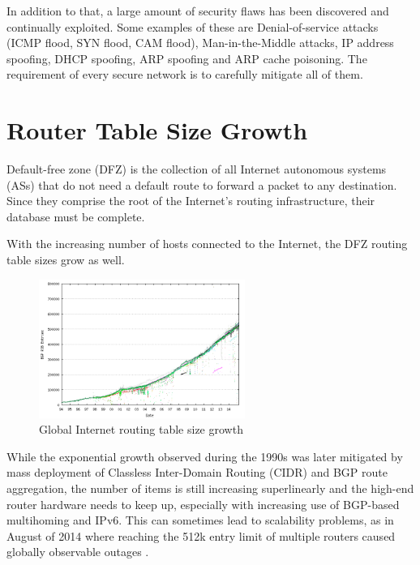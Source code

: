         In addition to that, a large amount of security flaws has been discovered and continually exploited. Some examples of these are Denial-of-service attacks (ICMP flood, SYN flood, CAM flood), Man-in-the-Middle attacks, IP address spoofing, DHCP spoofing, ARP spoofing and ARP cache poisoning. The requirement of every secure network is to carefully mitigate all of them.

    \section{Router Table Size Growth}

        Default-free zone (DFZ) is the collection of all Internet autonomous systems (ASs) that do not need a default route to forward a packet to any destination. Since they comprise the root of the Internet's routing infrastructure, their database must be complete.

        With the increasing number of hosts connected to the Internet, the DFZ routing table sizes grow as well.

        \begin{figure}[H]
            \begin{center}
                \includegraphics[width=0.6\textwidth]{fig/problems_bgp-growth.png}
              \caption{Global Internet routing table size growth \cite{bgpgrow}}
              \label{fig:bgp-growth}
            \end{center}
        \end{figure}


        While the exponential growth observed during the 1990s was later mitigated by mass deployment of Classless Inter-Domain Routing (CIDR) and BGP route aggregation, the number of items is still increasing superlinearly and the high-end router hardware needs to keep up, especially with increasing use of BGP-based multihoming and IPv6. This can sometimes lead to scalability problems, as in August of 2014 where reaching the 512k entry limit of multiple routers caused globally observable outages \cite{512k_day}.

